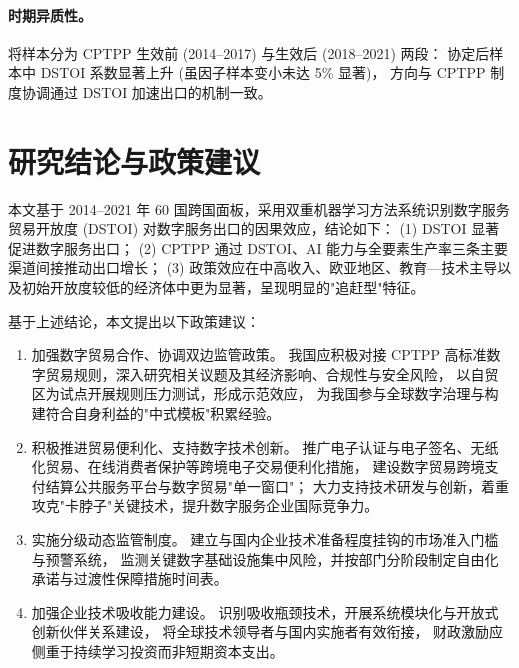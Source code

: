 \documentclass[11pt,a4paper]{article}
\begin{document}
\paragraph{\textbf{时期异质性。}}
将样本分为 CPTPP 生效前 (2014--2017) 与生效后 (2018--2021) 两段：
协定后样本中 DSTOI 系数显著上升 (虽因子样本变小未达 5\% 显著)，
方向与 CPTPP 制度协调通过 DSTOI 加速出口的机制一致。

\section{研究结论与政策建议}

本文基于 2014--2021 年 60 国跨国面板，采用双重机器学习方法系统识别数字服务贸易开放度 (DSTOI)
对数字服务出口的因果效应，结论如下：
(1) DSTOI 显著促进数字服务出口；
(2) CPTPP 通过 DSTOI、AI 能力与全要素生产率三条主要渠道间接推动出口增长；
(3) 政策效应在中高收入、欧亚地区、教育—技术主导以及初始开放度较低的经济体中更为显著，呈现明显的"追赶型"特征。

基于上述结论，本文提出以下政策建议：

\begin{enumerate}[label=\textbf{第\arabic*，},leftmargin=2.5em]
\item 加强数字贸易合作、协调双边监管政策。
我国应积极对接 CPTPP 高标准数字贸易规则，深入研究相关议题及其经济影响、合规性与安全风险，
以自贸区为试点开展规则压力测试，形成示范效应，
为我国参与全球数字治理与构建符合自身利益的"中式模板"积累经验。

\item 积极推进贸易便利化、支持数字技术创新。
推广电子认证与电子签名、无纸化贸易、在线消费者保护等跨境电子交易便利化措施，
建设数字贸易跨境支付结算公共服务平台与数字贸易"单一窗口"；
大力支持技术研发与创新，着重攻克"卡脖子"关键技术，提升数字服务企业国际竞争力。

\item 实施分级动态监管制度。
建立与国内企业技术准备程度挂钩的市场准入门槛与预警系统，
监测关键数字基础设施集中风险，并按部门分阶段制定自由化承诺与过渡性保障措施时间表。

\item 加强企业技术吸收能力建设。
识别吸收瓶颈技术，开展系统模块化与开放式创新伙伴关系建设，
将全球技术领导者与国内实施者有效衔接，
财政激励应侧重于持续学习投资而非短期资本支出。
\end{enumerate}
\end{document}
